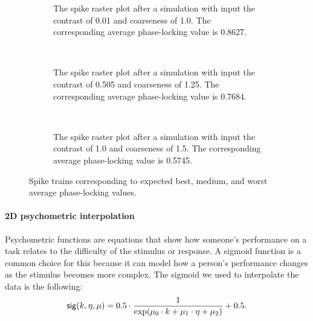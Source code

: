 \begin{figure}[p]
    \centering
    \begin{subfigure}[b]{\textwidth}
        \centering
        
        \vspace{-\baselineskip}
        \caption{The spike raster plot after a simulation with input the contrast of 0.01 and coarseness of 1.0. The corresponding average phase-locking value is 0.8627.}
        \label{fig:raster-best}
    \end{subfigure}
    \\ \vspace{\baselineskip}
    \begin{subfigure}[b]{\textwidth}
        \centering
        
        \vspace{-\baselineskip}
        \caption{The spike raster plot after a simulation with input the contrast of 0.505 and coarseness of 1.25. The corresponding average phase-locking value is 0.7684.}
        \label{fig:raster-mid}
    \end{subfigure}
    \\ \vspace{\baselineskip}
    \begin{subfigure}[b]{\textwidth}
        \centering
        
        \vspace{-\baselineskip}
        \caption{The spike raster plot after a simulation with input the contrast of 1.0 and coarseness of 1.5. The corresponding average phase-locking value is 0.5745.}
        \label{fig:raster-worst}
    \end{subfigure}
    \caption[Best-medium-worst spike trains]{Spike trains corresponding to expected best, medium, and worst average phase-locking values.}
    \label{fig:three-rasters}
\end{figure}

\paragraph{2D psychometric interpolation}

Psychometric functions are equations that show how someone's performance on a task relates to the difficulty of the stimulus or response. A sigmoid function is a common choice for this because it can model how a person's performance changes as the stimulus becomes more complex. The sigmoid we used to interpolate the data is the following:
\begin{equation}
    \mathsf{sig}(k, \eta, \mu) = 0.5 \cdot \frac{1}{
    \exp(\mu_0 \cdot k + \mu_1 \cdot \eta + \mu_2)
    } + 0.5.
\end{equation}

